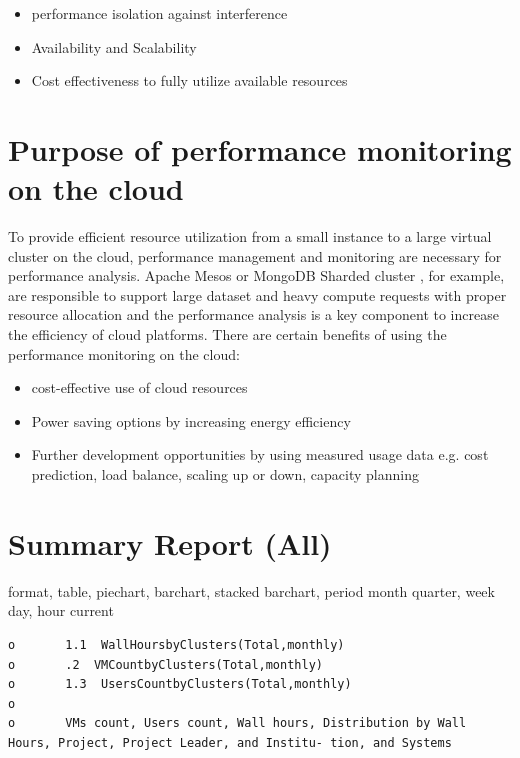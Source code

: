 \documentclass{sig-alternate-05-2015}
\begin{document}
\begin{itemize}
\item performance isolation against interference
\item Availability and Scalability
\item Cost effectiveness to fully utilize available resources
\end{itemize}


\section{Purpose of performance monitoring on the cloud}

To provide efficient resource utilization from a small instance to a large
virtual cluster on the cloud, performance management and monitoring are
necessary for performance analysis. Apache Mesos or MongoDB Sharded cluster ,
for example, are responsible to support large dataset and heavy compute
requests with proper resource allocation and the performance analysis is a key
component to increase the efficiency of cloud platforms. There are certain
benefits of using the performance monitoring on the cloud:
\begin{itemize}
\item cost-effective use of cloud resources
\item Power saving options by increasing energy efficiency
\item Further development opportunities by using measured usage data e.g. cost
      prediction, load balance, scaling up or down, capacity planning
\end{itemize}





\section{Summary Report (All)}

                                                                                       
format, table, piechart, barchart, stacked barchart, period month quarter, week day, hour current                                       

\begin{verbatim}
o       1.1  WallHoursbyClusters(Total,monthly)
o       .2  VMCountbyClusters(Total,monthly)
o       1.3  UsersCountbyClusters(Total,monthly)
o       
o       VMs count, Users count, Wall hours, Distribution by Wall Hours, Project, Project Leader, and Institu- tion, and Systems 

\end{verbatim}
\end{document}
